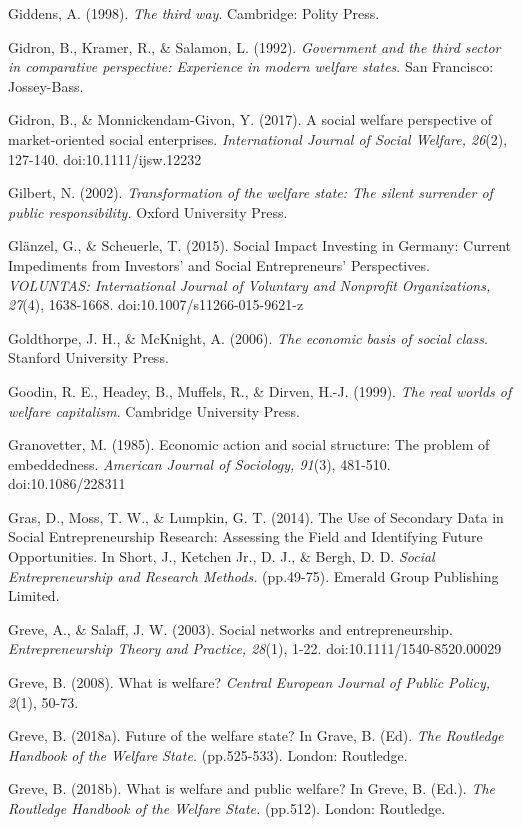 \documentclass{article}
\begin{document}
Giddens, A. (1998). \emph{The third way}. Cambridge: Polity Press.

Gidron, B., Kramer, R., \& Salamon, L. (1992). \emph{Government and the third sector in comparative perspective: Experience in modern welfare states}. San Francisco: Jossey-Bass.

Gidron, B., \& Monnickendam-Givon, Y. (2017). A social welfare perspective of market-oriented social enterprises. \emph{International Journal of Social Welfare, 26}(2), 127-140. doi:10.1111/ijsw.12232

Gilbert, N. (2002). \emph{Transformation of the welfare state: The silent surrender of public responsibility.} Oxford University Press.

Glänzel, G., \& Scheuerle, T. (2015). Social Impact Investing in Germany: Current Impediments from Investors' and Social Entrepreneurs' Perspectives. \emph{VOLUNTAS: International Journal of Voluntary and }\emph{Nonprofit}\emph{ Organizations, 27}(4), 1638-1668. doi:10.1007/s11266-015-9621-z

Goldthorpe, J. H., \& McKnight, A. (2006). \emph{The economic basis of social class}. Stanford University Press.

Goodin, R. E., Headey, B., Muffels, R., \& Dirven, H.-J. (1999). \emph{The real worlds of welfare capitalism}. Cambridge University Press.

Granovetter, M. (1985). Economic action and social structure: The problem of embeddedness. \emph{American Journal of Sociology, 91}(3), 481-510. doi:10.1086/228311

Gras, D., Moss, T. W., \& Lumpkin, G. T. (2014). The Use of Secondary Data in Social Entrepreneurship Research: Assessing the Field and Identifying Future Opportunities. In Short, J., Ketchen Jr., D. J., \& Bergh, D. D. \emph{Social Entrepreneurship and Research Methods.} (pp.49-75). Emerald Group Publishing Limited.

Greve, A., \& Salaff, J. W. (2003). Social networks and entrepreneurship. \emph{Entrepreneurship Theory and Practice, 28}(1), 1-22. doi:10.1111/1540-8520.00029

Greve, B. (2008). What is welfare? \emph{Central European Journal of Public Policy, 2}(1), 50-73. 

Greve, B. (2018a). Future of the welfare state? In Grave, B. (Ed). \emph{The Routledge Handbook of the Welfare State.} (pp.525-533). London: Routledge.

Greve, B. (2018b). What is welfare and public welfare? In Greve, B. (Ed.). \emph{The Routledge Handbook of the Welfare State.} (pp.512). London: Routledge.
\end{document}

